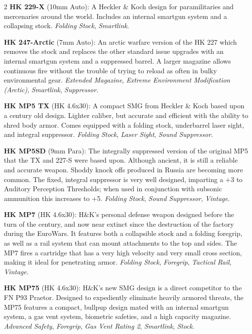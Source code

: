 \documentclass[
  oneside]{article}
\begin{document}
\begin{multicols}{2}
\textbf{HK 229-X} (10mm Auto): A Heckler \& Koch
design for paramilitaries and mercenaries around
the world. Includes an internal smartgun system
and a collapsing stock. \emph{Folding Stock},
\emph{Smartlink}.

\textbf{HK 247-Arctic} (7mm Auto): An arctic
warfare version of the HK 227 which removes the
stock and replaces the other standard issue
upgrades with an internal smartgun system and a
suppressed barrel. A larger magazine allows
continuous fire without the trouble of trying to
reload as often in bulky environmental gear.
\emph{Extended Magazine}, \emph{Extreme
Environment Modification (Arctic)},
\emph{Smartlink}, \emph{Suppressor}.

\textbf{HK MP5 TX} (HK 4.6x30): A compact SMG from
Heckler \& Koch based upon a century old design.
Lighter caliber, but accurate and efficient with
the ability to shred body armor. Comes equipped
with a folding stock, underbarrel laser sight, and
integral suppressor. \emph{Folding Stock},
\emph{Laser Sight}, \emph{Sound Suppressor}.

\textbf{HK MP5SD} (9mm Para): The integrally
suppressed version of the original MP5 that the TX
and 227-S were based upon. Although ancient, it is
still a reliable and accurate weapon. Shoddy knock
offs produced in Russia are becoming more common.
The fixed, integral suppressor is very well
designed, imparting a +3 to Auditory Perception
Thresholds; when used in conjunction with subsonic
ammunition this increases to +5. \emph{Folding
Stock}, \emph{Sound Suppressor}, \emph{Vintage}.

\textbf{HK MP7} (HK 4.6x30): H\&K's personal
defense weapon designed before the turn of the
century, and now near extinct since the
destruction of the factory during the EuroWars. It
features both a collapsible stock and a folding
foregrip, as well as a rail system that can mount
attachments to the top and sides. The MP7 fires a
cartridge that has a very high velocity and very
small cross section, making it ideal for
penetrating armor. \emph{Folding Stock},
\emph{Foregrip}, \emph{Tactical Rail},
\emph{Vintage}.

\textbf{HK MP75} (HK 4.6x30): H\&K's new SMG
design is a direct competitor to the FN P93
Praetor. Designed to expediently eliminate heavily
armored threats, the MP75 features a compact,
bullpup design mated with an internal smartgun
system, a gas vent system, biometric safeties, and
a high capacity magazine. \emph{Advanced Safety},
\emph{Foregrip}, \emph{Gas Vent Rating 2},
\emph{Smartlink}, \emph{Stock}.


\end{multicols}
\end{document}
